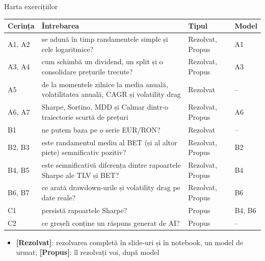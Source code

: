 \begin{frame}{Harta exercițiilor}
\itemsize{\small}
\begin{center}
\footnotesize
\begin{tabular}{>{\raggedright\arraybackslash}p{1.0cm}>{\raggedright\arraybackslash}p{7.6cm}>{\raggedright\arraybackslash}p{1.9cm}>{\raggedright\arraybackslash}p{1.4cm}}
\toprule
\textbf{Cerința} & \textbf{Întrebarea} & \textbf{Tipul} & \textbf{Model} \\
\midrule
A1, A2 & se adună în timp randamentele simple și cele logaritmice? & Rezolvat, Propus & A1 \\
A3, A4 & cum schimbă un dividend, un split și o consolidare prețurile trecute? & Rezolvat, Propus & A3 \\
A5 & de la momentele zilnice la media anuală, volatilitatea anuală, CAGR și volatility drag & Rezolvat & -- \\
A6, A7 & Sharpe, Sortino, MDD și Calmar dintr-o traiectorie scurtă de prețuri & Rezolvat, Propus & A6 \\
B1 & ne putem baza pe o serie EUR/RON? & Rezolvat & -- \\
B2, B3 & este randamentul mediu al BET (și al altor piețe) semnificativ pozitiv? & Rezolvat, Propus & B2 \\
B4, B5 & este semnificativă diferența dintre rapoartele Sharpe ale TLV și BET? & Rezolvat, Propus & B4 \\
B6, B7 & ce arată drawdown-urile și volatility drag pe date reale? & Rezolvat, Propus & B6 \\
C1 & persistă rapoartele Sharpe? & Propus & B4, B6 \\
C2 & ce greșeli conține un răspuns generat de AI? & Propus & -- \\
\bottomrule
\end{tabular}
\end{center}
\begin{itemize}
    \item \textbf{[Rezolvat]}: rezolvarea completă în slide-uri și în notebook, un model de urmat; \textbf{[Propus]}: îl rezolvați voi, după model
\end{itemize}
\end{frame}

